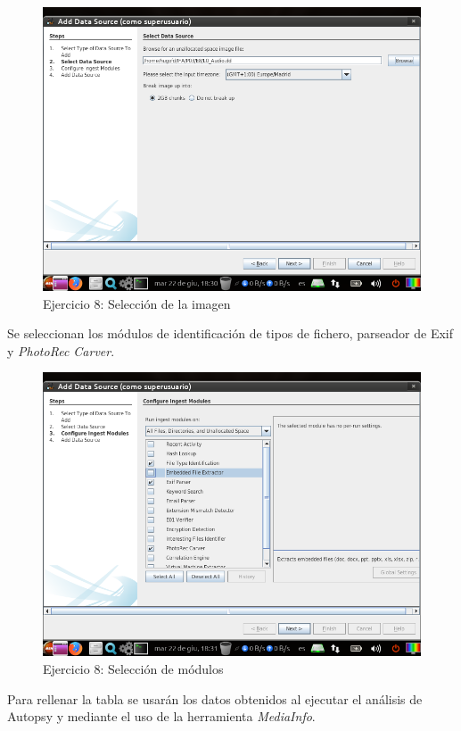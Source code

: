 \documentclass[11pt]{article}
\begin{document}
\begin{figure}[H]
    \caption{Ejercicio 8: Selección de la imagen}
    \centering
    \includegraphics[scale=0.7]{p03/e8-3.png}
\end{figure}

Se seleccionan los módulos de identificación de tipos de fichero, parseador de Exif y \textit{PhotoRec Carver}.

\begin{figure}[H]
    \caption{Ejercicio 8: Selección de módulos}
    \centering
    \includegraphics[scale=0.7]{p03/e8-4.png}
\end{figure}

Para rellenar la tabla se usarán los datos obtenidos al ejecutar el análisis de Autopsy y mediante el uso de la herramienta \textit{MediaInfo}.
\end{document}
